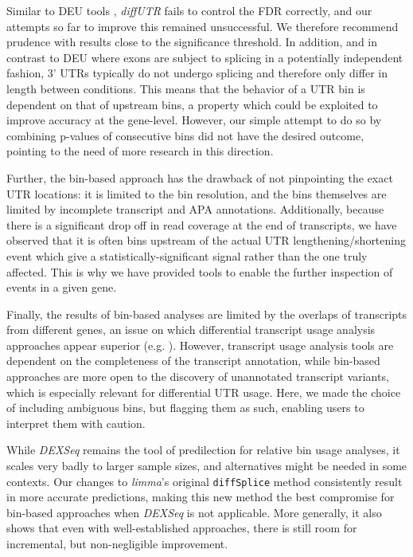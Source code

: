 \documentclass{bmcart}
\begin{document}
Similar to DEU tools \cite{Soneson2016IsoformUsage}, \textit{diffUTR} fails to control the FDR correctly, and our attempts so far to improve this remained unsuccessful. We therefore recommend prudence with results close to the significance threshold. In addition, and in contrast to DEU where exons are subject to splicing in a potentially independent fashion, 3' UTRs typically do not undergo splicing and therefore only differ in length between conditions. This means that the behavior of a UTR bin is dependent on that of upstream bins, a property which could be exploited to improve accuracy at the gene-level. However, our simple attempt to do so by combining p-values of consecutive bins did not have the desired outcome, pointing to the need of more research in this direction.

Further, the bin-based approach has the drawback of not pinpointing the exact UTR locations: it is limited to the bin resolution, and the bins themselves are limited by incomplete transcript and APA annotations. Additionally, because there is a significant drop off in read coverage at the end of transcripts, we have observed that it is often bins upstream of the actual UTR lengthening/shortening event which give a statistically-significant signal rather than the one truly affected. This is why we have provided tools to enable the further inspection of events in a given gene.

Finally, the results of bin-based analyses are limited by the overlaps of transcripts from different genes, an issue on which differential transcript usage analysis approaches appear superior (e.g. \cite{Tiberi2020BANDITS:Uncertainty}). However, transcript usage analysis tools are dependent on the completeness of the transcript annotation, while bin-based approaches are more open to the discovery of unannotated transcript variants, which is especially relevant for differential UTR usage. Here, we made the choice of including ambiguous bins, but flagging them as such, enabling users to interpret them with caution.

While \textit{DEXSeq} remains the tool of predilection for relative bin usage analyses, it scales very badly to larger sample sizes, and alternatives might be needed in some contexts. Our changes to \textit{limma}'s original \texttt{diffSplice} method consistently result in more accurate predictions, making this new method the best compromise for bin-based approaches when \textit{DEXSeq} is not applicable. More generally, it also shows that even with well-established approaches, there is still room for incremental, but non-negligible improvement.
\end{document}
